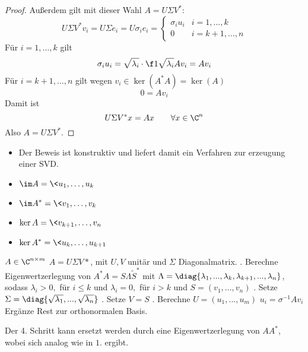 \documentclass[11pt]{scrbook}
\begin{document}
\begin{st}
\begin{proof}
		Außerdem gilt mit dieser Wahl $A=U\Sigma V^*$:
		\[
			U\Sigma V^* v_i = U \Sigma e_i = U \sigma_i e_i = \begin{cases}
				\sigma_i u_i & i=1,\dotsc,k \\
				0 & i =k+1,\dotsc,n
			\end{cases}
		\]
		Für $i=1,\dotsc,k$ gilt
		\[
			\sigma_i u_i = \sqrt{\lambda_i} \cdot \f 1{\sqrt{\lambda_i}}Av_i = Av_i
		\]
		Für $i=k+1,\dotsc, n$ gilt wegen $v_i \in \ker (A^*A) = \ker (A)$
		\[
			0 = Av_i
		\]
		Damit ist
		\[
			U\Sigma V^* x = Ax \qquad \forall x\in \C^n
		\]
		Also $A= U\Sigma V^*$.
	\end{proof}
	\begin{note}
		\begin{itemize}
			\item
				Der Beweis ist konstruktiv und liefert damit ein Verfahren zur erzeugung einer SVD.
			\item
				$\displaystyle \im A = \<u_1,\dotsc,u_k\>$
			\item
				$\displaystyle \im A^* = \<v_1,\dotsc, v_k\>$
			\item
				$\displaystyle \ker A = \<v_{k+1},\dotsc, v_n\>$
			\item
				$\displaystyle \ker A^* = \<u_k,\dotsc, u_{k+1}\>$
		\end{itemize}
	\end{note}
\end{st}
\begin{alg*}[SVD]
\begin{algorithmic}
\Assume $ A\in \C^{n\times m} $
\Ensure $ A=U\Sigma V*$, mit $ U,V $  unitär und $\Sigma$ Diagonalmatrix. 
. Berechne Eigenwertzerlegung von $ A^*A=S\Lambda \tilde{S}^* $ mit $ \Lambda=\diag\{\lambda_1,..., \lambda_k, \lambda_{k+1},...,\lambda_{n}\} $, sodass $ \lambda_i>0, $ für $ i\le k $ und $ \lambda_i=0, $ für $ i>k $ und $ S=(v_1,...,v_n) $
. Setze $ \Sigma=\diag{\sqrt{\lambda_1}, ..., \sqrt{\lambda_n}} $
. Setze $ V=S $
. Berechne $ U=(u_1,...,u_m) $
\State $ u_i=\sigma^{-1}Av_i $
\EndFor
\State Ergänze Rest zur orthonormalen Basis.
\end{algorithmic}
\end{alg*}
\begin{note*}
Der 4. Schritt kann ersetzt werden durch eine Eigenwertzerlegung von $ AA^* $, wobei sich analog wie in $ 1. $ ergibt.
\end{note*}
\end{document}
